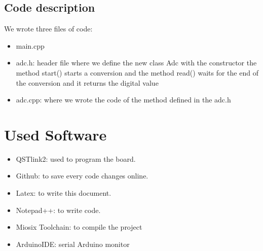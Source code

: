 \documentclass[18pt,oneside,a4paper, titlepage]{article}
\begin{document}
	\subsection{Code description}
		We wrote three files of code:
		\begin{itemize}
			\item main.cpp
			\item adc.h: header file where we define the new class Adc with the constructor the method start() starts a conversion and the method read() waits for the end of the conversion and it returns the digital value
			\item adc.cpp: where we wrote the code of the method defined in the adc.h
		\end{itemize}
\newpage
		
\newpage
\section{Used Software}
\begin{itemize}
	\item QSTlink2: used to program the board.
	\item Github: to save every code changes  online.
	\item Latex: to write this document.
	\item Notepad++: to write code.
	\item Miosix Toolchain: to compile the project
	\item ArduinoIDE: serial Arduino monitor 

\end{itemize}
\end{document}
